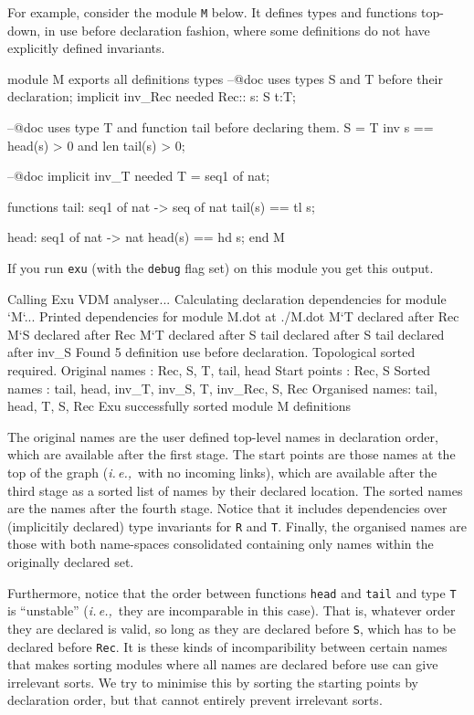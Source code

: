 \documentclass[runningheads,a4paper]{llncs}
\newcommand{\ie}{{\em i.\,e.,\/}}
\begin{document}
For example, consider the module \verb'M' below. It defines types and functions top-down, in use before declaration fashion, where some definitions do not have explicitly defined invariants. 
%
\begin{vdmsl}[frame=none,basicstyle=\ttfamily\scriptsize,numbers=left,stepnumber=1]
    module M 
    exports all
    definitions 
    types 
        --@doc uses types S and T before their declaration; implicit inv_Rec needed
        Rec:: s: S t:T;
        
        --@doc uses type T and function tail before declaring them.
        S = T inv s == head(s) > 0 and len tail(s) > 0;
        
        --@doc implicit inv_T needed
        T = seq1 of nat;

    functions
        tail: seq1 of nat -> seq of nat
        tail(s) == tl s;

        head: seq1 of nat -> nat
        head(s) == hd s;
    end M
\end{vdmsl}
%
If you run \verb'exu' (with the \verb'debug' flag set) on this module you get this output. 
%
\begin{vdmsl}[frame=none,basicstyle=\ttfamily\scriptsize]
    Calling Exu VDM analyser...
    Calculating declaration dependencies for module `M`...
    Printed dependencies for module M.dot at ./M.dot
    M`T declared after Rec
    M`S declared after Rec
    M`T declared after S
    tail declared after S
    tail declared after inv_S
    Found 5 definition use before declaration. Topological sorted required.
    Original names : Rec, S, T, tail, head
    Start points   : Rec, S
    Sorted names   : tail, head, inv_T, inv_S, T, inv_Rec, S, Rec
    Organised names: tail, head, T, S, Rec
    Exu successfully sorted module M definitions
\end{vdmsl}
%
The original names are the user defined top-level names in declaration order, which are available after the first stage. The start points are those names at the top of the graph (\ie~with no incoming links), which are available after the third stage as a sorted list of names by their declared location. The sorted names are the names after the fourth stage. Notice that it includes dependencies over (implicitily declared) type invariants for \verb'R' and \verb'T'. Finally, the organised names are those with both name-spaces consolidated containing only names within the originally declared set. 

Furthermore, notice that the order between functions \verb'head' and \verb'tail' and type \verb'T' is ``unstable'' (\ie~they are incomparable in this case). That is, whatever order they are declared is valid, so long as they are declared before \verb'S', which has to be declared before \verb'Rec'. It is these kinds of incomparibility between certain names that makes sorting modules where all names are declared before use can give irrelevant sorts. We try to minimise this by sorting the starting points by declaration order, but that cannot entirely prevent irrelevant sorts.  
\end{document}
